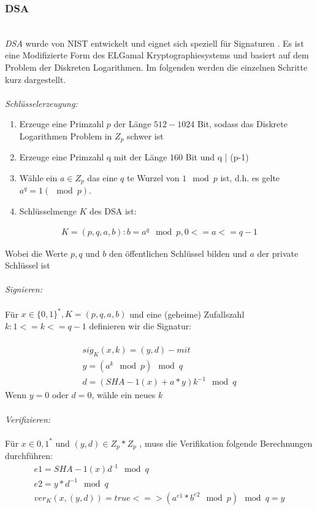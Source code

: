 \subsubsection{DSA}\hspace*{\fill} \\
\textit{DSA} wurde von NIST entwickelt und eignet sich speziell für Signaturen \cite{shin2003new}. Es ist eine Modifizierte Form des ELGamal Kryptographiesystems und basiert auf dem Problem der Diskreten Logarithmen. Im folgenden werden die einzelnen Schritte kurz dargestellt. \\\\
\textit{Schlüsselerzeugung:} 
\begin{enumerate}
\item Erzeuge eine Primzahl $p$ der Länge $512-1024$ Bit, sodass das Diskrete
Logarithmen Problem in $Z_p$ schwer ist
\item Erzeuge eine Primzahl q mit der Länge 160 Bit und q | (p-1)
\item Wähle ein $a \in Z_p$ das eine $q$ te Wurzel von $1 \mod p$ ist, d.h. es gelte
$a^q = 1 (\mod p)$.
\item Schlüsselmenge $K$ des DSA ist:

\end{enumerate}
\begin{equation}
	\begin{split}
		K=(p,q,a,b) :b=a^q \mod p,     0<=a<=q-1
 	\end{split}
\end{equation}
	
Wobei die Werte $p, q$ und $b$ den öffentlichen Schlüssel bilden und
$a$ der private Schlüssel ist
\\\\
\textit{Signieren:} 
\\\\
Für $x \in \{0,1\}^*, K = (p, q,  a, b)$ und eine (geheime) Zufallszahl $k: 1<=k<= q-1$
definieren wir die Signatur:
\\\\
\begin{equation}
	\begin{split}
		sig_K(x,k)=(y,d)-    mit	\\	
	y=(a^k \mod p) \mod q \\
			d=(SHA-1(x)+a*y)k^{-1} \mod q 
 	\end{split}
\end{equation}
Wenn $y = 0$ oder $d = 0$, wähle ein neues $k$	
\\\\
\textit{Verifizieren:}
\\\\
Für $x \in {0,1}^*$ und $(y, d) \in Z_p * Z_p$ , muss die Verifikation folgende
Berechnungen durchführen:
\begin{equation}
\begin{split}
		e1 = SHA-1(x) d^{–1} \mod q	\\	
		e2 = y*d^{-1} \mod q \\
			ver_K(x, (y,d)) = true <=> (a^{e1}*b^{e2} \mod p) \mod q = y 
\end{split}
\end{equation}